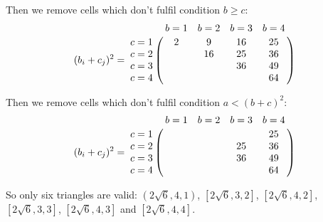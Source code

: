 \documentclass[11pt]{article}
\begin{document}
Then we remove cells which don't fulfil condition $b \ge c$:
\begin {equation}\label{E:2}
(b_i + c_j)^2 =\bordermatrix{~ & b=1 & b=2 & b=3 & b=4 \cr
c=1 &  2 &  9 & 16 & 25 \cr    
c=2 &    & 16 & 25 & 36 \cr    
c=3 &    &    & 36 & 49 \cr    
c=4 &    &    &    & 64 \cr}
    \end {equation}

Then we remove cells which don't fulfil condition $a < (b+c)^2$:
\begin {equation}\label{E:3}
(b_i + c_j)^2 =\bordermatrix{~ & b=1 & b=2 & b=3 & b=4 \cr
c=1 &    &    &    & 25 \cr    
c=2 &    &    & 25 & 36 \cr    
c=3 &    &    & 36 & 49 \cr    
c=4 &    &    &    & 64 \cr}
    \end {equation}
    
So only six triangles are valid: $(2\sqrt{6},4,1)$, $[2\sqrt{6},3,2]$, $[2\sqrt{6},4,2]$, $[2\sqrt{6},3,3]$, $[2\sqrt{6},4,3]$ and $[2\sqrt{6},4,4]$.
\end{document}

